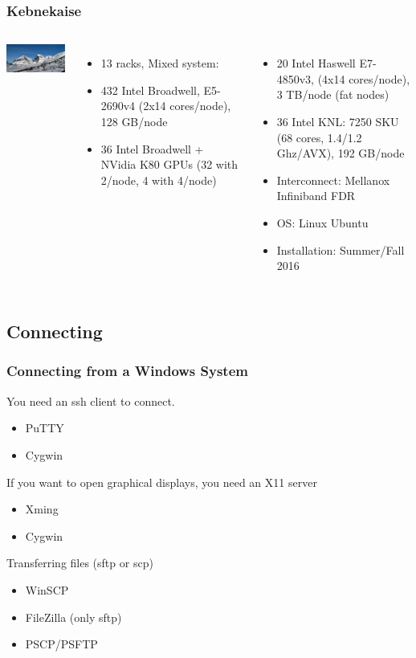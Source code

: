 \begin{frame}
	\frametitle{Kebnekaise}
\begin{columns}
	\column[T]{5cm}
\includegraphics[width=5cm]{images/kebnekaise.eps}
	\begin{itemize}
		\item	13 racks, Mixed system:
		\item	432 Intel Broadwell, E5-2690v4 (2x14 cores/node), 128 GB/node
		\item	36 Intel Broadwell + NVidia K80 GPUs (32 with 2/node, 4 with 4/node)
	\end{itemize}
	\column[T]{5cm}
	\begin{itemize}
		\item	20 Intel Haswell E7-4850v3, (4x14 cores/node), 3 TB/node (fat nodes)
		\item	36 Intel KNL: 7250 SKU (68 cores, 1.4/1.2 Ghz/AVX), 192 GB/node
		\item	Interconnect: Mellanox Infiniband FDR
	        \item   OS: Linux Ubuntu
	        \item   Installation: Summer/Fall 2016
	\end{itemize}
\end{columns}
\end{frame}



\subsection{Connecting}

\begin{frame}
	\frametitle{Connecting from a Windows System}

	You need an ssh client to connect.
	\begin{itemize}
		\item	PuTTY
		\item	Cygwin
	\end{itemize}

	If you want to open graphical displays, you need an X11 server
	\begin{itemize}
		\item	Xming
		\item	Cygwin
	\end{itemize}

	Transferring files (sftp or scp)
	\begin{itemize}
		\item	WinSCP
		\item	FileZilla (only sftp)
		\item	PSCP/PSFTP
	\end{itemize}

\end{frame}

